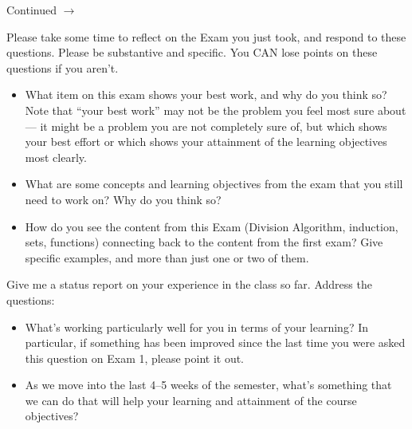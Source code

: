 \documentclass[addpoints]{exam}
\def\pageturn{\vfill
\begin{flushright}
	\begin{small}
		Continued $\rightarrow$
	\end{small}
\end{flushright}
\newpage}
\begin{document}
\begin{questions}

\pageturn


\question[6] Please take some time to reflect on the Exam you just took, and respond to these questions. Please be substantive and specific. You CAN lose points on these questions if you aren't. 
	\begin{itemize}
		\item What item on this exam shows your best work, and why do you think so? Note that ``your best work'' may not be the problem you feel most sure about --- it might be a problem you are not completely sure of, but which shows your best effort or which shows your attainment of the learning objectives most clearly. 
		\item What are some concepts and learning objectives from the exam that you still need to work on? Why do you think so? 
		\item How do you see the content from this Exam (Division Algorithm, induction, sets, functions) connecting back to the content from the first exam? Give specific examples, and more than just one or two of them. 
	\end{itemize}

\question[4] Give me a status report on your experience in the class so far. Address the questions: 
\begin{itemize}
	\item What's working particularly well for you in terms of your learning? In particular, if something has been improved since the last time you were asked this question on Exam 1, please point it out. 
	\item As we move into the last 4--5 weeks of the semester, what's something that we can do that will help your learning and attainment of the course objectives? 
\end{itemize}

	
\end{questions}

		
\end{document}
